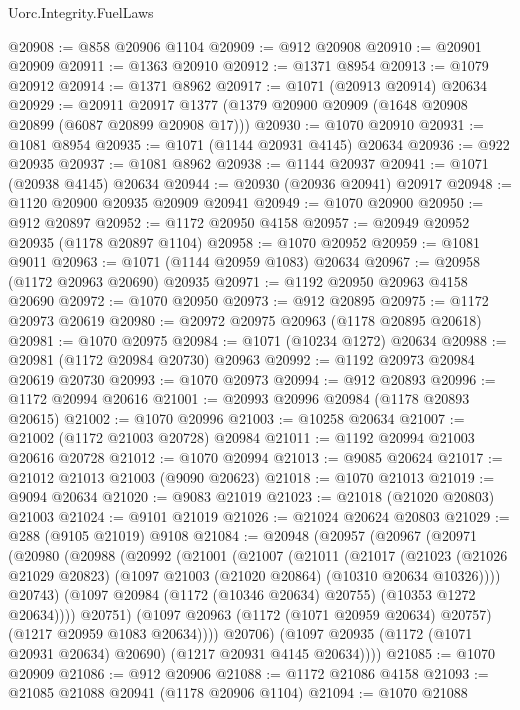 \begin{lexlean}{Uorc.Integrity.FuelLaws}
\begin{coremodule}
@20908 := @858 @20906 @1104
@20909 := @912 @20908
@20910 := @20901 @20909
@20911 := @1363 @20910
@20912 := @1371 @8954
@20913 := @1079 @20912
@20914 := @1371 @8962
@20917 := @1071 (@20913 @20914) @20634
@20929 := @20911 @20917 @1377 (@1379 @20900 @20909 (@1648 @20908 @20899 (@6087 @20899 @20908 @17)))
@20930 := @1070 @20910
@20931 := @1081 @8954
@20935 := @1071 (@1144 @20931 @4145) @20634
@20936 := @922 @20935
@20937 := @1081 @8962
@20938 := @1144 @20937
@20941 := @1071 (@20938 @4145) @20634
@20944 := @20930 (@20936 @20941) @20917
@20948 := @1120 @20900 @20935 @20909 @20941
@20949 := @1070 @20900
@20950 := @912 @20897
@20952 := @1172 @20950 @4158
@20957 := @20949 @20952 @20935 (@1178 @20897 @1104)
@20958 := @1070 @20952
@20959 := @1081 @9011
@20963 := @1071 (@1144 @20959 @1083) @20634
@20967 := @20958 (@1172 @20963 @20690) @20935
@20971 := @1192 @20950 @20963 @4158 @20690
@20972 := @1070 @20950
@20973 := @912 @20895
@20975 := @1172 @20973 @20619
@20980 := @20972 @20975 @20963 (@1178 @20895 @20618)
@20981 := @1070 @20975
@20984 := @1071 (@10234 @1272) @20634
@20988 := @20981 (@1172 @20984 @20730) @20963
@20992 := @1192 @20973 @20984 @20619 @20730
@20993 := @1070 @20973
@20994 := @912 @20893
@20996 := @1172 @20994 @20616
@21001 := @20993 @20996 @20984 (@1178 @20893 @20615)
@21002 := @1070 @20996
@21003 := @10258 @20634
@21007 := @21002 (@1172 @21003 @20728) @20984
@21011 := @1192 @20994 @21003 @20616 @20728
@21012 := @1070 @20994
@21013 := @9085 @20624
@21017 := @21012 @21013 @21003 (@9090 @20623)
@21018 := @1070 @21013
@21019 := @9094 @20634
@21020 := @9083 @21019
@21023 := @21018 (@21020 @20803) @21003
@21024 := @9101 @21019
@21026 := @21024 @20624 @20803
@21029 := @288 (@9105 @21019) @9108
@21084 := @20948
    (@20957
      (@20967
        (@20971
          (@20980
            (@20988
              (@20992
                (@21001
                  (@21007
                    (@21011
                      (@21017
                        (@21023
                          (@21026 @21029 @20823)
                          (@1097 @21003 (@21020 @20864) (@10310 @20634 @10326))))
                      @20743)
                    (@1097 @20984 (@1172 (@10346 @20634) @20755) (@10353 @1272 @20634))))
                @20751)
              (@1097 @20963 (@1172 (@1071 @20959 @20634) @20757) (@1217 @20959 @1083 @20634))))
          @20706)
        (@1097 @20935 (@1172 (@1071 @20931 @20634) @20690) (@1217 @20931 @4145 @20634))))
@21085 := @1070 @20909
@21086 := @912 @20906
@21088 := @1172 @21086 @4158
@21093 := @21085 @21088 @20941 (@1178 @20906 @1104)
@21094 := @1070 @21088

\end{coremodule}
\end{lexlean}
